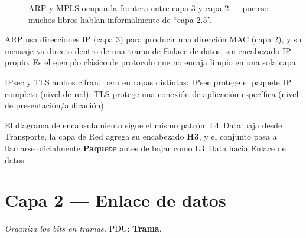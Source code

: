\documentclass[11pt,a4paper]{article}
\begin{document}
\begin{figure}[h]
\centering
{}
\caption{ARP y MPLS ocupan la frontera entre capa 3 y capa 2 --- por eso muchos libros hablan informalmente de ``capa 2.5''.}
\end{figure}

\begin{examfact}
ARP usa direcciones IP (capa 3) para producir una dirección MAC (capa 2), y su mensaje va directo dentro de una trama de Enlace de datos, sin encabezado IP propio. Es el ejemplo clásico de protocolo que no encaja limpio en una sola capa.
\end{examfact}

\begin{examfact}
IPsec y TLS ambos cifran, pero en capas distintas: IPsec protege el paquete IP completo (nivel de red); TLS protege una conexión de aplicación específica (nivel de presentación/aplicación).
\end{examfact}

El diagrama de encapsulamiento sigue el mismo patrón: L4~Data baja desde Transporte, la capa de Red agrega su encabezado \textbf{H3}, y el conjunto pasa a llamarse oficialmente \textbf{Paquete} antes de bajar como L3~Data hacia Enlace de datos.

\newpage
\section{Capa 2 --- Enlace de datos}
\textit{Organiza los bits en tramas.} PDU: \textbf{Trama}.
\end{document}

